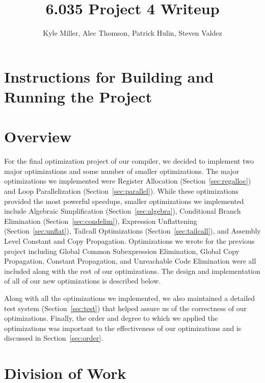 \documentclass[11pt]{article}
\title{6.035 Project 4 Writeup}
\author{Kyle Miller, Alec Thomson, Patrick Hulin, Steven Valdez}
\begin{document}
\maketitle

\section {Instructions for Building and Running the Project}


\section {Overview}

For the final optimization project of our compiler, we decided to
implement two major optimizations and some number of smaller
optimizations. The major optimizations we implemented were Register
Allocation (Section~\ref{sec:regalloc}) and Loop Parallelization
(Section~\ref{sec:parallel}). While these optimizations provided the
most powerful speedups, smaller optimizations we implemented include
Algebraic Simplification (Section~\ref{sec:algebra}), Conditional
Branch Elimination (Section~\ref{sec:condelim}), Expression
Unflattening (Section~\ref{sec:unflat}), Tailcall
Optimizations (Section~\ref{sec:tailcall}), and Assembly Level
Constant and Copy Propagation. Optimizations we wrote for the previous
project including Global Common Subexpression Elimination, Global Copy
Propagation, Constant Propagation, and Unreachable Code Elimination
were all included along with the rest of our optimizations. The design
and implementation of all of our new optimizations is described
below. 

Along with all the optimizations we implemented, we also maintained a
detailed test system (Section~\ref{sec:test}) that helped assure us
of the correctness of our optimizations. Finally, the order and degree
to which we applied the optimizations was important to the
effectiveness of our optimizations and is discussed in Section~\ref{sec:order}.

\section {Division of Work}
\end{document}
